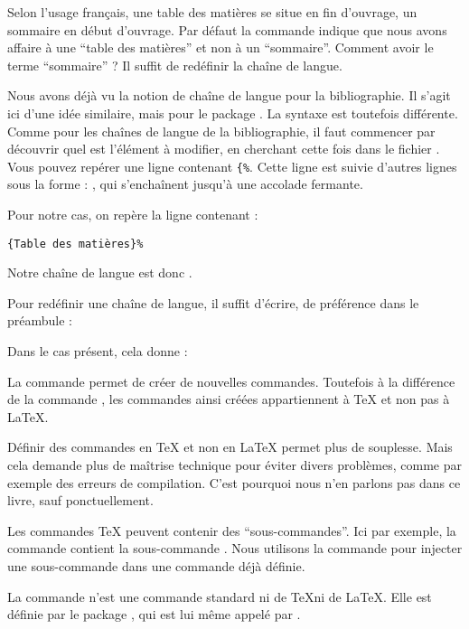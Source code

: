 Selon l'usage français, une table des matières se situe en fin d'ouvrage, un sommaire  en début d'ouvrage. Par défaut la commande  indique que nous avons affaire à une  \enquote{table des matières} et non  à un \enquote{sommaire}. Comment avoir le terme  \enquote{sommaire} ? Il suffit de redéfinir la chaîne de langue. 

Nous avons déjà vu la notion de chaîne de langue pour la bibliographie. Il s'agit ici  d'une idée similaire, mais pour le package . La syntaxe est toutefois différente. Comme pour les  chaînes de langue de la bibliographie, il faut commencer par découvrir quel est l'élément à modifier, en cherchant cette fois dans le fichier . Vous pouvez repérer une ligne contenant \verb|{%|. 
Cette ligne est suivie d'autres lignes sous la forme : , qui s'enchaînent jusqu'à une accolade fermante.

Pour notre cas, on repère la ligne contenant :

 \verb|{Table des matières}%|

Notre chaîne de langue est donc .

Pour  redéfinir une chaîne de langue, il suffit d'écrire, de préférence dans le préambule :

\begin{latexcode}
\gappto\captionsfrench{\renewcommand{<\chaine>}{Valeur}}
\end{latexcode}

Dans le cas présent, cela donne :

\begin{latexcode}
\gappto\captionsfrench{\renewcommand{\contentsname}{Sommaire}}
\end{latexcode}



\begin{plusloins}
La commande  permet de créer de nouvelles commandes. Toutefois à la différence de la commande , les commandes ainsi créées appartiennent à \TeX{} et non pas à \LaTeX{}.

Définir des commandes en \TeX{} et non en \LaTeX{} permet plus de souplesse. Mais cela demande plus de maîtrise technique pour éviter divers problèmes, comme par exemple des erreurs de compilation. C'est pourquoi nous n'en parlons pas dans ce livre, sauf ponctuellement.

Les commandes \TeX{} peuvent contenir des \enquote{sous-commandes}. Ici par exemple, la commande  contient la sous-commande . Nous utilisons la commande   pour injecter une sous-commande dans une commande déjà définie.

La commande  n'est une commande standard ni de \TeX ni de \LaTeX. Elle est définie par le package , qui est lui même appelé par .
\end{plusloins}

